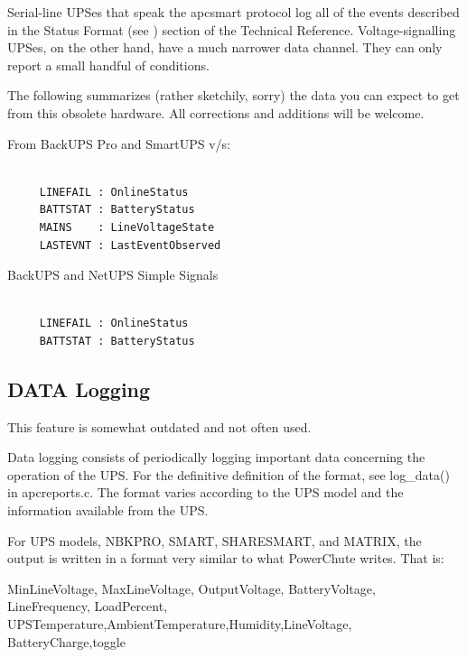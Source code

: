 {{{{{{{{{{Serial-line UPSes that speak the apcsmart protocol log all of the events
described in the Status Format (see 
) section of
the Technical Reference.  Voltage-signalling UPSes, on the other hand, have a
much narrower data channel.  They can only report a small handful of
conditions.  

The following summarizes (rather sketchily, sorry) the data you can expect to
get from this obsolete hardware.  All corrections and additions will be
welcome.  

From BackUPS Pro and SmartUPS v/s: 

\footnotesize
\begin{verbatim}
     
     LINEFAIL : OnlineStatus
     BATTSTAT : BatteryStatus
     MAINS    : LineVoltageState
     LASTEVNT : LastEventObserved
\end{verbatim}
\normalsize

BackUPS and NetUPS Simple Signals 

\footnotesize
\begin{verbatim}
     
     LINEFAIL : OnlineStatus
     BATTSTAT : BatteryStatus
\end{verbatim}
\normalsize

\label{DATA-Logging}

\subsection*{DATA Logging}

\label{index-Logging_002c-DATA-233}
\label{index-DATA-Logging-234}
This feature is somewhat outdated and not often used.  

Data logging consists of periodically logging important data concerning the
operation of the UPS. For the definitive definition of the format, see
log\_data() in apcreports.c. The format varies according to the UPS model and
the information available from the UPS.  

For UPS models, NBKPRO, SMART, SHARESMART, and MATRIX, the output is written
in a format very similar to what PowerChute writes. That is:  

MinLineVoltage, MaxLineVoltage, OutputVoltage, BatteryVoltage, LineFrequency,
LoadPercent, UPSTemperature,AmbientTemperature,Humidity,LineVoltage,
BatteryCharge,toggle  

}}}}}}}}}}
